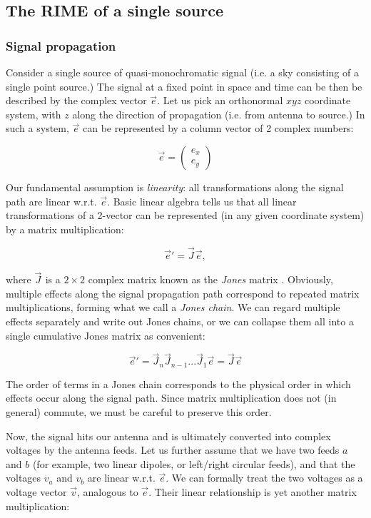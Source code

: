 \documentclass[]{aa}
\newcommand{\jones}[2]{\vec {#1}_{#2}}
\begin{document}
\subsection{The RIME of a single source\label{sec:me-single-source}}

\subsubsection{Signal propagation}

Consider a single source of quasi-monochromatic signal (i.e. a sky consisting of a single point source.) The signal at a fixed point in space and time can be then be described by the complex vector $\vec e$. Let us pick an orthonormal $xyz$ coordinate system, with $z$ along the direction of propagation (i.e. from antenna to source.) In such a system, $\vec e$ can be represented by a column vector of 2 complex numbers:

\[
\vec e = \left( \begin{array}{c}e_x\\e_y\end{array} \right) 
\]

Our fundamental assumption is {\em linearity}: all transformations along the signal path are linear w.r.t. $\vec e$. Basic linear algebra tells us that all linear transformations of a 2-vector can be represented (in any given coordinate system) by a matrix multiplication:

\[
\vec e' = \jones{J}{} \vec e,
\]

where $\jones{J}{}$ is a $2\times2$ complex matrix known as the {\em Jones} matrix \citep{jones}. Obviously, multiple effects along the signal propagation path correspond to repeated matrix multiplications, forming what we call a {\em Jones chain}. We can regard multiple effects separately and write out Jones chains, or we can collapse them all into a single cumulative Jones matrix as convenient:

\begin{equation}\label{eq:jones-chain}
\vec e' = \jones{J}{n} \jones{J}{n-1} ... \jones{J}{1} \vec e = \jones{J}{} \vec e
\end{equation}

The order of terms in a Jones chain corresponds to the physical order in which effects occur along the signal path. Since matrix multiplication does not (in general) commute, we must be careful to preserve this order. 

Now, the signal hits our antenna and is ultimately converted into complex voltages by the antenna feeds. Let us further assume that we have two feeds $a$ and $b$ (for example, two linear dipoles, or left/right circular feeds), and that the voltages $v_a$ and $v_b$ are linear w.r.t. $\vec e$. We can formally treat the two voltages as a voltage vector $\vec v$, analogous to $\vec e$. Their linear relationship is yet another matrix multiplication:
\end{document}
